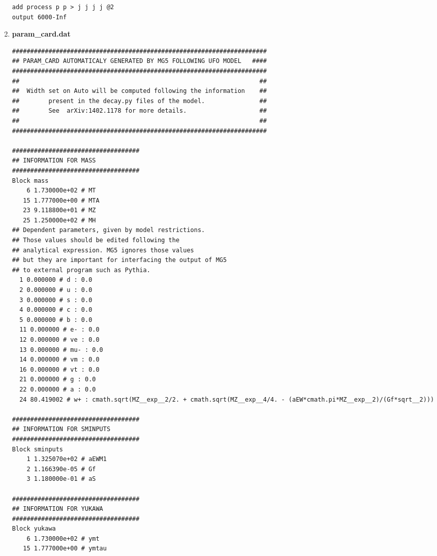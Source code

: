 \begin{enumerate}
\begin{lstlisting}
add process p p > j j j j @2
output 6000-Inf
\end{lstlisting}
\item \textbf{param\_card.dat}
\begin{lstlisting}
######################################################################
## PARAM_CARD AUTOMATICALY GENERATED BY MG5 FOLLOWING UFO MODEL   ####
######################################################################
##                                                                  ##
##  Width set on Auto will be computed following the information    ##
##        present in the decay.py files of the model.               ##
##        See  arXiv:1402.1178 for more details.                    ##
##                                                                  ##
######################################################################

###################################
## INFORMATION FOR MASS
###################################
Block mass 
    6 1.730000e+02 # MT 
   15 1.777000e+00 # MTA 
   23 9.118800e+01 # MZ 
   25 1.250000e+02 # MH 
## Dependent parameters, given by model restrictions.
## Those values should be edited following the 
## analytical expression. MG5 ignores those values 
## but they are important for interfacing the output of MG5
## to external program such as Pythia.
  1 0.000000 # d : 0.0 
  2 0.000000 # u : 0.0 
  3 0.000000 # s : 0.0 
  4 0.000000 # c : 0.0 
  5 0.000000 # b : 0.0 
  11 0.000000 # e- : 0.0 
  12 0.000000 # ve : 0.0 
  13 0.000000 # mu- : 0.0 
  14 0.000000 # vm : 0.0 
  16 0.000000 # vt : 0.0 
  21 0.000000 # g : 0.0 
  22 0.000000 # a : 0.0 
  24 80.419002 # w+ : cmath.sqrt(MZ__exp__2/2. + cmath.sqrt(MZ__exp__4/4. - (aEW*cmath.pi*MZ__exp__2)/(Gf*sqrt__2))) 

###################################
## INFORMATION FOR SMINPUTS
###################################
Block sminputs 
    1 1.325070e+02 # aEWM1 
    2 1.166390e-05 # Gf 
    3 1.180000e-01 # aS 

###################################
## INFORMATION FOR YUKAWA
###################################
Block yukawa 
    6 1.730000e+02 # ymt 
   15 1.777000e+00 # ymtau 


\end{lstlisting}
\end{enumerate}
